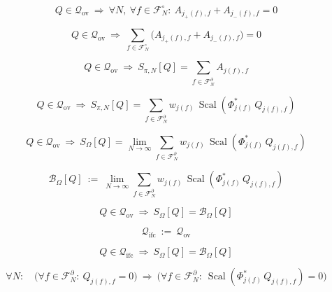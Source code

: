 \documentclass[12pt]{article}
\begin{document}
\begin{equation}
Q\in\mathcal{Q}_{\mathrm{ov}}\ \Longrightarrow\ \forall N,\ \forall f\in\mathcal{F}_N^\circ:\ A_{j_+(f),f}+A_{j_-(f),f}=0
\end{equation}

\begin{equation}
Q\in\mathcal{Q}_{\mathrm{ov}}\ \Longrightarrow\ \sum_{f\in\mathcal{F}_N^\circ}\Big(A_{j_+(f),f}+A_{j_-(f),f}\Big)=0
\end{equation}

\begin{equation}
Q\in\mathcal{Q}_{\mathrm{ov}}\ \Longrightarrow\ S_{\pi,N}[Q]=\sum_{f\in\mathcal{F}_N^\partial}A_{j(f),f}
\end{equation}

\begin{equation}
Q\in\mathcal{Q}_{\mathrm{ov}}\ \Longrightarrow\ S_{\pi,N}[Q]=\sum_{f\in\mathcal{F}_N^\partial} w_{j(f)}\,\operatorname{Scal}\!\left(\Phi_{j(f)}^*\,Q_{j(f),f}\right)
\end{equation}

\begin{equation}
Q\in\mathcal{Q}_{\mathrm{ov}}\ \Longrightarrow\ S_\Omega[Q]
=\lim_{N\to\infty}\sum_{f\in\mathcal{F}_N^\partial} w_{j(f)}\,\operatorname{Scal}\!\left(\Phi_{j(f)}^*\,Q_{j(f),f}\right)
\end{equation}

\begin{equation}
\mathcal{B}_\Omega[Q]\ :=\ \lim_{N\to\infty}\sum_{f\in\mathcal{F}_N^\partial} w_{j(f)}\,\operatorname{Scal}\!\left(\Phi_{j(f)}^*\,Q_{j(f),f}\right)
\end{equation}

\begin{equation}
Q\in\mathcal{Q}_{\mathrm{ov}}\ \Longrightarrow\ S_\Omega[Q]=\mathcal{B}_\Omega[Q]
\end{equation}

\begin{equation}
\mathcal{Q}_{\mathrm{ifc}}\ :=\ \mathcal{Q}_{\mathrm{ov}}
\end{equation}

\begin{equation}
Q\in\mathcal{Q}_{\mathrm{ifc}}\ \Longrightarrow\ S_\Omega[Q]=\mathcal{B}_\Omega[Q]
\end{equation}

\begin{equation}
\forall N:\quad \Big(\forall f\in\mathcal{F}_N^\partial:\ Q_{j(f),f}=0\Big)\ \Longrightarrow\ \Big(\forall f\in\mathcal{F}_N^\partial:\ \operatorname{Scal}\!\left(\Phi_{j(f)}^*\,Q_{j(f),f}\right)=0\Big)
\end{equation}
\end{document}
